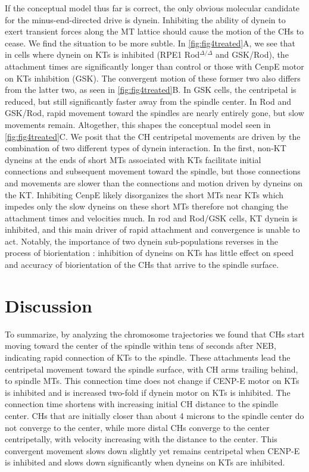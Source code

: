 \documentclass[times, twoside,onecolumn]{zHenriquesLab-StyleBioRxiv}
\begin{document}
If the conceptual model thus far is correct, the only obvious molecular candidate for the minus-end-directed drive is dynein. Inhibiting the ability of dynein to exert transient forces along the MT lattice should cause the motion of the CHs to cease. We find the situation to be more subtle. In \cref{fig:fig4treated}A, we see that in cells where dynein on KTs is inhibited (RPE1 Rod${}^{\Delta/\Delta}$ and GSK/Rod), the attachment times are significantly longer than control or those with CenpE motor on KTs inhibition (GSK). The convergent motion of these former two also differs from the latter two, as seen in \cref{fig:fig4treated}B. In GSK cells, the centripetal is reduced, but still significantly faster away from the spindle center. In Rod and GSK/Rod, rapid movement toward the spindles are nearly entirely gone, but slow movements remain. Altogether, this shapes the conceptual model seen in \cref{fig:fig4treated}C. We posit that the CH centripetal movements are driven by the combination of two different types of dynein interaction. In the first, non-KT dyneins at the ends of short MTs associated with KTs facilitate initial connections and subsequent movement toward the spindle, but those connections and movements are slower than the connections and motion driven by dyneins on the KT. Inhibiting CenpE likely disorganizes the short MTs near KTs which impedes only the slow dyneins on these short MTs therefore not changing the attachment times and velocities much. In rod and Rod/GSK cells, KT dynein is inhibited, and this main driver of rapid attachment and convergence is unable to act. Notably, the importance of two dynein sub-populations reverses in the process of biorientation \cite{Renda2022}: inhibition of dyneins on KTs has little effect on speed and accuracy of biorientation of the CHs that arrive to the spindle surface. 

\section*{Discussion}

To summarize, by analyzing the chromosome trajectories we found that CHs start moving toward the center of the spindle within tens of seconds after NEB, indicating rapid connection of KTs to the spindle. These attachments lead the centripetal movement toward the spindle surface, with CH arms trailing behind, to spindle MTs. This connection time does not change if CENP-E motor on KTs is inhibited and is increased two-fold if dynein motor on KTs is inhibited. The connection time shortens with increasing initial CH distance to the spindle center. CHs that are initially closer than about 4 microns to the spindle center do not converge to the center, while more distal CHs converge to the center centripetally, with velocity increasing with the distance to the center. This convergent movement slows down slightly yet remains centripetal when CENP-E is inhibited and slows down significantly when dyneins on KTs are inhibited.
\end{document}
